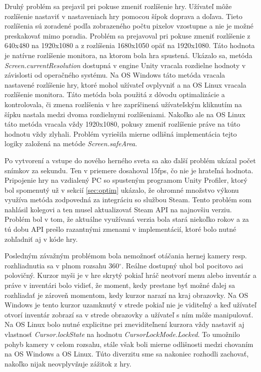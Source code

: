 \documentclass[slovak, bachelorpractice]{diploma}
\begin{document}
Druhý problém sa prejavil pri pokuse zmeniť rozlíšenie hry. Užívateľ môže rozlíšenie nastaviť v nastaveniach hry pomocou šípok doprava a doľava. Tieto rozlíšenia sú zoradené podľa zobrazeného počtu pixelov vzostupne a nie je možné preskakovať mimo poradia. Problém sa prejavoval pri pokuse zmeniť rozlíšenie z 640x480 na 1920x1080 a z rozlíšenia 1680x1050 opäť na 1920x1080. Táto hodnota je natívne rozlíšenie monitora, na ktorom bola hra spustená. Ukázalo sa, metóda \textit{Screen.currentResolution} dostupná v engine Unity vracala rozdielne hodnoty v závislosti od operačného systému. Na OS Windows táto metóda vracala nastavené rozlíšenie hry, ktoré mohol užívateľ ovplyvniť a na OS Linux vracala rozlíšenie monitora. Táto metóda bola použitá z dôvodu optimalizácie a kontrolovala, či zmena rozlíšenia v hre zapríčinená užívateľským kliknutím na šípku nastala medzi dvoma rozdielnymi rozlíšeniami. Nakoľko ale na OS Linux táto metóda vracala vždy 1920x1080, pokusy zmeniť rozlíšenie práve na túto hodnotu vždy zlyhali. Problém vyriešila mierne odlišná implementácia tejto logiky založená na metóde \textit{Screen.safeArea}.

Po vytvorení a vstupe do nového herného sveta sa ako ďalší problém ukázal počet snímkov za sekundu. Ten v priemere dosahoval 15fps, čo nie je hrateľná hodnota. Pripojenie hry na vzdialený PC so spusteným programom Unity Profiler, ktorý bol spomenutý už v sekcií \ref{sec:optim} ukázalo, že ohromné množstvo výkonu využíva metóda zodpovedná za integráciu so službou Steam. Tento problém som nahlásil kolegovi a ten musel aktualizovať Steam API na najnovšiu verziu. Problém bol v tom, že aktuálne využívaná verzia bola stará niekoľko rokov a za tú dobu API prešlo razantnými zmenami v implementácií, ktoré bolo nutné zohľadniť aj v kóde hry.

Posledným závažným problémom bola nemožnosť otáčania hernej kamery resp. rozhliadnutia sa v plnom rozsahu 360$^{\circ}$. Reálne dostupný uhol bol pocitovo asi polovičný. Kurzor myši je v hre skrytý pokiaľ hráč neotvorí menu alebo inventár a práve v inventári bolo vidieť, že moment, kedy prestane byť možné ďalej sa rozhliadať je zároveň momentom, kedy kurzor narazí na kraj obrazovky. Na OS Windows je tento kurzor uzamknutý v strede pokiaľ nie je viditeľný a keď užívateľ otvorí inventár zobrazí sa v strede obrazovky a užívateľ s ním môže manipulovať. Na OS Linux bolo nutné explicitne pri zneviditeľnení kurzora vždy nastaviť aj vlastnosť \textit{Cursor.lockState} na hodnotu \textit{CursorLockMode.Locked}. To umožnilo pohyb kamery v celom rozsahu, stále však boli mierne odlišnosti medzi chovaním na OS Windows a OS Linux. Túto diverzitu sme sa nakoniec rozhodli zachovať, nakoľko nijak neovplyvňuje zážitok z hry.
\end{document}
